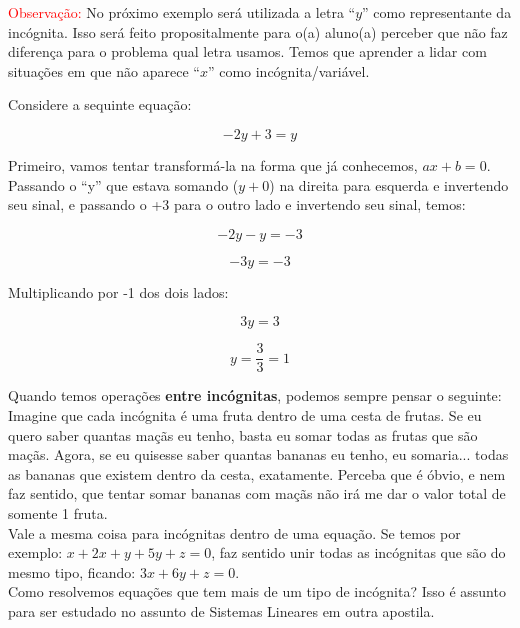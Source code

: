 \textcolor{red}{Observação:} No próximo exemplo será utilizada a letra ``$y$'' como representante da incógnita. Isso será feito propositalmente para o(a) aluno(a) perceber que não faz diferença para o problema qual letra usamos. Temos que aprender a lidar com situações em que não aparece ``$x$'' como incógnita/variável.

\begin{exemplo}
    Considere a sequinte equação:

    \begin{equation}
        -2y+3=y
    \end{equation}

    Primeiro, vamos tentar transformá-la na forma que já conhecemos, \(ax+b=0\). Passando o ``y'' que estava somando ($y+0$) na direita para esquerda e invertendo seu sinal, e passando o +3 para o outro lado e invertendo seu sinal, temos:

    \begin{equation}
        -2y-y=-3
    \end{equation}

    \begin{equation}
        -3y=-3
    \end{equation}

    Multiplicando por -1 dos dois lados:
    
    \begin{equation}
        3y=3
    \end{equation}

    \begin{equation}
        y=\frac{3}{3}=1
    \end{equation}
\end{exemplo}

\begin{tcolorbox}[title=IMPORTANTE]
    Quando temos operações \textbf{entre incógnitas}, podemos sempre pensar o seguinte: \\
    
    Imagine que cada incógnita é uma fruta dentro de uma cesta de frutas. Se eu quero saber quantas maçãs eu tenho, basta eu somar todas as frutas que são maçãs. Agora, se eu quisesse saber quantas bananas eu tenho, eu somaria... todas as bananas que existem dentro da cesta, exatamente. Perceba que é óbvio, e nem faz sentido, que tentar somar bananas com maçãs não irá me dar o valor total de somente 1 fruta.\\

    Vale a mesma coisa para incógnitas dentro de uma equação. Se temos por exemplo: \(x+2x+y+5y+z=0\), faz sentido unir todas as incógnitas que são do mesmo tipo, ficando: \(3x+6y+z=0\).\\

    Como resolvemos equações que tem mais de um tipo de incógnita? Isso é assunto para ser estudado no assunto de Sistemas Lineares em outra apostila.
\end{tcolorbox}